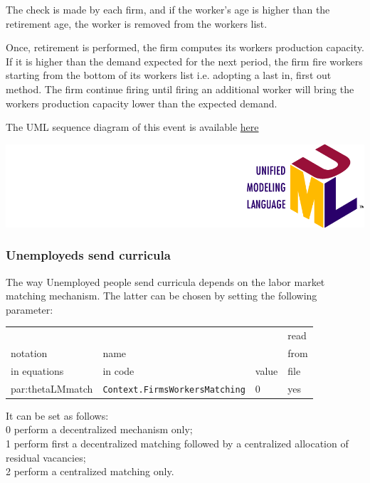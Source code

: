 \documentclass{book}
\newcommand{\doclocation}{file:///Users/giulioni/Documents/workspace/gabriele/docs}
\begin{document}
\vskip3mm
The check is made by each firm, and if the worker's age is higher than the retirement age, the worker is removed from the workers list.


Once, retirement is performed, the firm computes its workers production capacity.
If it is higher than the demand expected for the next period, the firm fire workers starting from the bottom of its workers list i.e. adopting a last in, first out method.
The firm continue firing until firing an additional worker will bring the workers production capacity lower than the expected demand.

\vskip3mm
The UML sequence diagram of this event is available \href{\doclocation/umldoc/laborForceDownwardAdjustment.html}{here}
\begin{marginfigure}
	\includegraphics[scale=0.1]{uml.png}
\end{marginfigure}


\subsubsection{Unemployeds send curricula}

The way Unemployed people send curricula depends on the labor market matching mechanism. The latter can be chosen by setting the following parameter:\\

\vskip2mm
\noindent
\begin{tabular}{l l l l}
	\hline
	& &&read\\
	notation& name &&from\\
	in equations& in code&value&file\\
	\hline
	\hline
	\gls{par:thetaLMmatch}&\verb+Context.FirmsWorkersMatching+&0&yes\\
	\hline
\end{tabular}

\vskip3mm
It can be set as follows:\\
0 perform a decentralized mechanism only;\\
1 perform first a decentralized matching followed by a centralized allocation of residual vacancies;\\
2 perform a centralized matching only.
\end{document}
